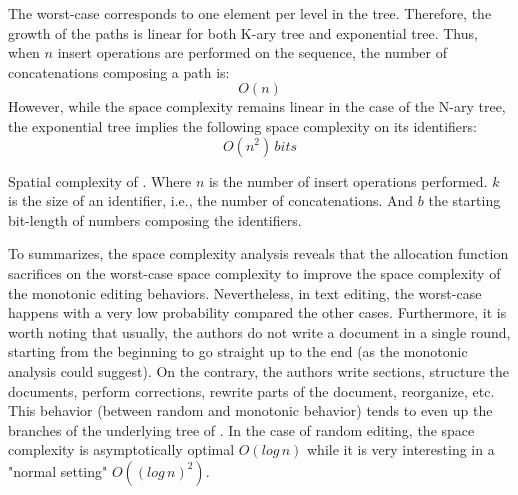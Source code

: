 \begin{asparadesc}
\item [The worst-case] corresponds to one element per level in the
  tree. Therefore, the growth of the paths is linear for both K-ary tree and
  exponential tree. Thus, when $n$ insert operations are performed on the
  sequence, the number of concatenations composing a path is:
  \begin{equation} O(n) \end{equation} However, while the space complexity
  remains linear in the case of the N-ary tree, the exponential tree implies
  the following space complexity on its identifiers:
  \begin{equation} O(n^2) \, bits \end{equation}
\end{asparadesc}

\begin{table*}
  \centering
  
  \caption{\label{table:lseqcomplexities}
    Spatial complexity of \LSEQ. Where $n$ is the number
    of insert operations performed. $k$ is the size of an identifier, i.e.,
    the number of concatenations. And $b$ the starting bit-length of numbers
    composing the identifiers.}
\end{table*}



To summarizes, the space complexity analysis reveals that the allocation
function \LSEQ sacrifices on the worst-case space complexity to improve the
space complexity of the monotonic editing behaviors. Nevertheless, in text
editing, the worst-case happens with a very low probability compared the other
cases. Furthermore, it is worth noting that usually, the authors do not write a
document in a single round, starting from the beginning to go straight up to
the end (as the monotonic analysis could suggest). On the contrary, the authors
write sections, structure the documents, perform corrections, rewrite parts of
the document, reorganize, etc. This behavior (between random and monotonic
behavior) tends to even up the branches of the underlying tree of \LSEQ. In
the case of random editing, the space complexity is asymptotically optimal
$O(log\,n)$ while it is very interesting in a "normal setting" $O((log\,n)^2)$.


